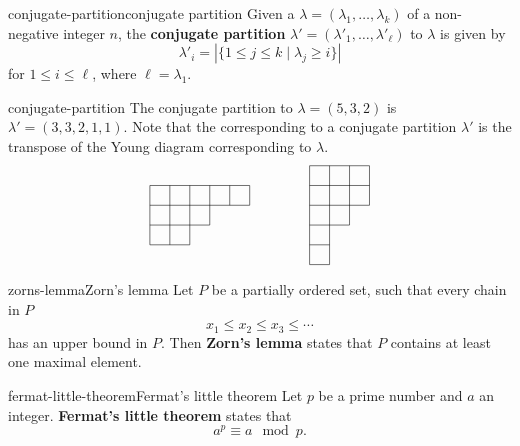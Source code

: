 \begin{topic}{conjugate-partition}{conjugate partition}
    Given a  $\lambda = (\lambda_1, \ldots, \lambda_k)$ of a non-negative integer $n$, the \textbf{conjugate partition} $\lambda' = (\lambda'_1, \ldots, \lambda'_\ell)$ to $\lambda$ is given by
    \[ \lambda'_i = | \{ 1 \le j \le k \mid \lambda_j \ge i \} | \]
    for $1 \le i \le \ell$, where $\ell = \lambda_1$.
\end{topic}

\begin{example}{conjugate-partition}
    The conjugate partition to $\lambda = (5, 3, 2)$ is $\lambda' = (3, 3, 2, 1, 1)$. Note that the  corresponding to a conjugate partition $\lambda'$ is the transpose of the Young diagram corresponding to $\lambda$.
    \[ \begin{tikzpicture}
        \begin{scope}[scale=0.5]
            \draw (0, 3) -- (5, 3); \draw (0, 2) -- (5, 2); \draw (0, 1) -- (3, 1); \draw (0, 0) -- (2, 0); \draw (0, 3) -- (0, 0); \draw (1, 3) -- (1, 0); \draw (2, 3) -- (2, 0); \draw (3, 3) -- (3, 1); \draw (4, 3) -- (4, 2); \draw (5, 3) -- (5, 2);
        \end{scope}
        \begin{scope}[scale=0.5, shift={(8, -1)}]
            \draw (0, 5) -- (3, 5); \draw (0, 4) -- (3, 4); \draw (0, 3) -- (3, 3); \draw (0, 2) -- (2, 2); \draw (0, 1) -- (1, 1); \draw (0, 0) -- (1, 0); \draw (0, 0) -- (0, 5); \draw (1, 0) -- (1, 5); \draw (2, 2) -- (2, 5); \draw (3, 3) -- (3, 5);
        \end{scope}
    \end{tikzpicture}\]
\end{example}

\begin{topic}{zorns-lemma}{Zorn's lemma}
    Let $P$ be a partially ordered set, such that every chain in $P$
    \[ x_1 \le x_2 \le x_3 \le \cdots \]
    has an upper bound in $P$. Then \textbf{Zorn's lemma} states that $P$ contains at least one maximal element.
\end{topic}

\begin{topic}{fermat-little-theorem}{Fermat's little theorem}
    Let $p$ be a prime number and $a$ an integer. \textbf{Fermat's little theorem} states that
    \[ a^p \equiv a \mod p . \]
\end{topic}

